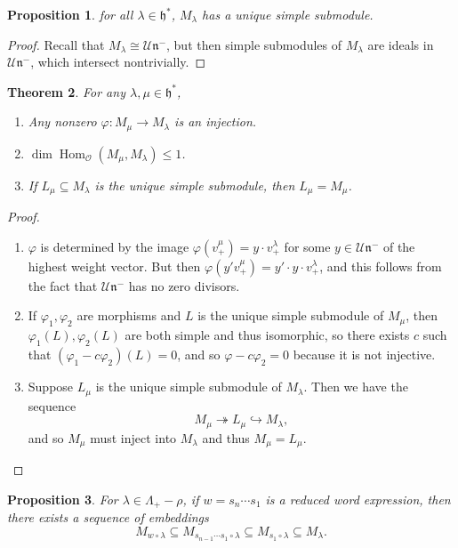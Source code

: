 \documentclass[leqno, openany]{memoir}
\newtheorem{thm}{Theorem}[section]
\newtheorem{prop}[thm]{Proposition}
\theoremstyle{definition}
\theoremstyle{remark}
\theoremstyle{plain}
\theoremstyle{definition}
\theoremstyle{remark}
\newcommand{\U}{\mathcal{U}}
\newcommand{\cO}{\mathcal{O}}
\newcommand{\h}{\mathfrak{h}}
\newcommand{\n}{\mathfrak{n}}
\DeclareMathOperator{\Hom}{Hom}
\begin{document}
\begin{prop}
    for all $\lambda \in \h^*$, $M_{\lambda}$ has a unique simple submodule.
\end{prop}

\begin{proof}
    Recall that $M_{\lambda} \cong \U \n^-$, but then simple submodules of $M_{\lambda}$ are ideals in $\U \n^-$, which intersect nontrivially.
\end{proof}

\begin{thm}
    For any $\lambda, \mu \in \h^*$,
    \begin{enumerate}
        \item Any nonzero $\varphi \colon M_{\mu} \to M_{\lambda}$ is an injection.
        \item $\dim \Hom_{\cO}(M_{\mu}, M_{\lambda}) \leq 1$.
        \item If $L_{\mu} \subseteq M_{\lambda}$ is the unique simple submodule, then $L_{\mu} = M_{\mu}$.
    \end{enumerate}
\end{thm}

\begin{proof}\leavevmode
    \begin{enumerate}
        \item $\varphi$ is determined by the image $\varphi(v_+^{\mu}) = y \cdot v_+^{\lambda}$ for some $y \in \U \n^-$ of the highest weight vector. But then $\varphi(y' v_+^{\mu}) = y' \cdot y \cdot v_+^{\lambda}$, and this follows from the fact that $\U \n^-$ has no zero divisors.
        \item If $\varphi_1, \varphi_2$ are morphisms and $L$ is the unique simple submodule of $M_{\mu}$, then $\varphi_1(L), \varphi_2(L)$ are both simple and thus isomorphic, so there exists $c$ such that $(\varphi_1 - c \varphi_2)(L) = 0$, and so $\varphi - c \varphi_2 = 0$ because it is not injective.
        \item Suppose $L_{\mu}$ is the unique simple submodule of $M_{\lambda}$. Then we have the sequence
            \[ M_{\mu} \twoheadrightarrow L_{\mu} \hookrightarrow M_{\lambda}, \]
            and so $M_{\mu}$ must inject into $M_{\lambda}$ and thus $M_{\mu} = L_{\mu}$.\qedhere
    \end{enumerate}
\end{proof}

\begin{prop}
    For $\lambda \in \Lambda_+ - \rho$, if $w = s_n \cdots s_1$ is a reduced word expression, then there exists a sequence of embeddings
    \[ M_{w \circ \lambda} \subseteq M_{s_{n-1} \cdots s_1 \circ \lambda} \subseteq M_{s_1 \circ \lambda} \subseteq M_{\lambda}. \]
\end{prop}
\end{document}

